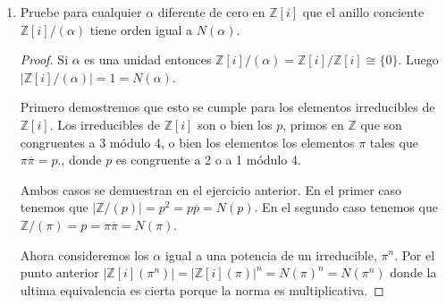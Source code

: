 \documentclass[letter,twoside,12pt]{article}
\begin{document}
\begin{enumerate}[label=\textbf{(\alph*)}]
\begin{proof}
Finalmente utilizando el teorema de Lagrange concluimos que

\begin{equation}
|\mathbb{Z}[i]/(\pi^{n})| = |(\mathbb{Z}[i]/(\pi^{n+1}))| / |(\mathbb{Z}[i]/(\pi))| \nonumber
\end{equation}

y utilizando la hipótesis de inducción llegamos al resultado deseado.
\begin{eqnarray}
|\mathbb{Z}[i]/(\pi^{n})||(\mathbb{Z}[i]/(\pi))| = |(\mathbb{Z}[i]/(\pi^{n+1}))| \nonumber
\\|\mathbb{Z}[i]/(\pi)|^{n}|(\mathbb{Z}[i]/(\pi))| = |(\mathbb{Z}[i]/(\pi^{n+1}))| \nonumber
\\|\mathbb{Z}[i]/(\pi)|^{n+1} = |(\mathbb{Z}[i]/(\pi^{n+1}))| \nonumber
\end{eqnarray}
\end{proof}
\item Pruebe para cualquier $ \alpha $ diferente de cero en $ \mathbb{Z}[i] $ que el anillo conciente $ \mathbb{Z}[i]/(\alpha) $ tiene orden igual a $ N(\alpha) $.

\begin{proof}

Si $ \alpha $ es una unidad entonces $ \mathbb{Z}[i]/(\alpha)=\mathbb{Z}[i]/\mathbb{Z}[i] \cong \{0\} $. Luego $ |\mathbb{Z}[i]/(\alpha)| = 1 = N(\alpha)$.

Primero demostremos que esto se cumple para los elementos irreducibles de $ \mathbb{Z}[i] $. Los irreducibles de $ \mathbb{Z}[i] $ son o bien los $p$, primos en $ \mathbb{Z} $ que son congruentes a 3 módulo 4, o bien los elementos los elementos $ \pi $ tales que $ \pi\overline{\pi} = p$., donde $ p $ es congruente a 2 o a 1 módulo $ 4 $.

Ambos casos se demuestran en el ejercicio anterior. En el primer caso tenemos que $|\mathbb{Z}/(p)|=p^2=p\overline{p}=N(p)$. En el segundo caso tenemos que $ \mathbb{Z}/(\pi) = p = \pi \overline{\pi} = N(\pi)  $.

Ahora consideremos los $ \alpha $ igual a una potencia de un irreducible, $ \pi ^n $. Por el punto anterior $ |\mathbb{Z}[i](\pi^n)| = |\mathbb{Z}[i](\pi)|^n = N(\pi)^n = N(\pi^n)$
donde la ultima equivalencia es cierta porque la norma es multiplicativa.


\end{proof}
\end{enumerate}
\end{document}
